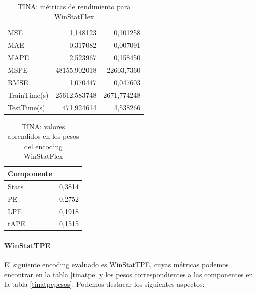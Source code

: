 \begin{table}[!ht]
	\centering
	\begin{tabular}{l|N|N}
		\toprule
		 &  &  \\
		\midrule
		MSE & 1,148123 & 0,101258 \\
		MAE & 0,317082 & 0,007091 \\
		MAPE & 2,523967 & 0,158450 \\
		MSPE & 48155,902018 & 22603,7360 \\
		RMSE & 1,070447 & 0,047603 \\
		TrainTime(s) & 25612,583748 & 2671,774248 \\
		TestTime(s) & 471,924614 & 4,538266 \\
		\bottomrule
	\end{tabular}
	\caption{TINA: métricas de rendimiento para WinStatFlex}
	\label{tinaflex}
\end{table}
 
\begin{table}[!ht]
	\centering
		\begin{tabular}{l|N}
		\toprule
		Componente &  \\
		\midrule
		Stats & 0,3814 \\
		PE & 0,2752 \\
		LPE & 0,1918 \\
		tAPE & 0,1515 \\
		\bottomrule
	\end{tabular}
	\caption{TINA: valores aprendidos en los pesos del encoding WinStatFlex}
	\label{tinaflexpesos}
\end{table}

\paragraph{WinStatTPE}

El siguiente encoding evaluado es WinStatTPE, cuyas métricas podemos encontrar en la tabla \ref{tinatpe} y los pesos correspondientes a las componentes en la tabla \ref{tinatpepesos}. Podemos destacar los siguientes aspectos:

